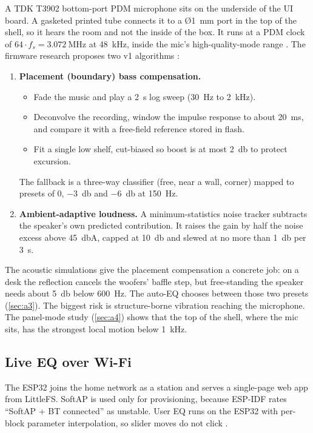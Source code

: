 A TDK T3902 bottom-port PDM microphone sits on the underside of the UI board. A gasketed printed tube connects it to a Ø\qty{1}{\milli\metre} port in the top of the shell, so it hears the room and not the inside of the box. It runs at a PDM clock of $64\cdot f_s = \qty{3.072}{\mega\hertz}$ at \qty{48}{\kilo\hertz}, inside the mic's high-quality-mode range  . The firmware research proposes two v1 algorithms :
\begin{enumerate}
  \item \textbf{Placement (boundary) bass compensation.}
  \begin{itemize}
    \item Fade the music and play a \qty{2}{\second} log sweep (\qty{30}{\hertz} to \qty{2}{\kilo\hertz}).
    \item Deconvolve the recording, window the impulse response to about \qty{20}{\milli\second}, and compare it with a free-field reference stored in flash.
    \item Fit a single low shelf, cut-biased so boost is at most \qty{+2}{\decibel} to protect excursion.
  \end{itemize}
  The fallback is a three-way classifier (free, near a wall, corner) mapped to presets of 0, \qty{-3}{\decibel} and \qty{-6}{\decibel} at \qty{150}{\hertz}.
  \item \textbf{Ambient-adaptive loudness.} A minimum-statistics noise tracker subtracts the speaker's own predicted contribution. It raises the gain by half the noise excess above \qty{45}{\decibel}A, capped at \qty{+10}{\decibel} and slewed at no more than \qty{1}{\decibel} per \qty{3}{\second}.
\end{enumerate}
The acoustic simulations give the placement compensation a concrete job: on a desk the reflection cancels the woofers' baffle step, but free-standing the speaker needs about \qty{+5}{\decibel} below \qty{600}{\hertz}. The auto-EQ chooses between those two presets (\cref{sec:a3}). The biggest risk is structure-borne vibration reaching the microphone. The panel-mode study (\cref{sec:a4}) shows that the top of the shell, where the mic sits, has the strongest local motion below \qty{1}{\kilo\hertz}.

\subsection{Live EQ over Wi-Fi}

The ESP32 joins the home network as a station and serves a single-page web app from LittleFS. SoftAP is used only for provisioning, because ESP-IDF rates ``SoftAP + BT connected'' as unstable. User EQ runs on the ESP32 with per-block parameter interpolation, so slider moves do not click .

